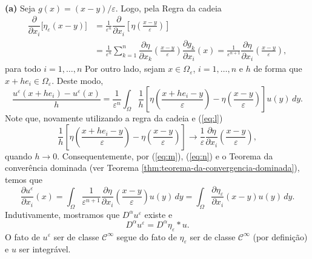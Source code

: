 \documentclass[a4paper, 11pt]{book}
\theoremstyle{definition}
\newcommand{\cC}{\mathcal{C}}
\begin{document}
\begin{prf}
    ~

    \textbf{(a)} Seja $g(x) = (x-y)/\varepsilon $. Logo, pela Regra da cadeia
    \begin{equation} \label{eq:l}
        \begin{aligned}
            \dfrac{\partial}{\partial x_i} \big[\eta_\varepsilon(x-y)\big] &= \frac{1}{\varepsilon^n}\dfrac{\partial }{\partial x_i}\left[\eta\left( \frac{x - y}{\varepsilon} \right) \right]\\ &= \frac{1}{\varepsilon^n} \sum_{k =1}^n \dfrac{\partial \eta}{\partial x_k}\left( \frac{x - y}{\varepsilon} \right) \dfrac{\partial g_k}{\partial x_i}(x) = \frac{1}{\varepsilon^{n+1}} \dfrac{\partial \eta}{\partial x_i}\left( \frac{x - y}{\varepsilon} \right),
        \end{aligned}
    \end{equation}
    para todo $i = 1,\dots,n$ Por outro lado, sejam $x \in \Omega_\varepsilon$, $i = 1,\dots,n$ e $h$ de forma que $x + he_i \in \Omega_\varepsilon$. Deste modo,
    \begin{equation} \label{eq:m}
        \frac{u^\varepsilon(x + he_i) - u^\varepsilon(x)}{h} 
            = \frac{1}{\varepsilon^n} \int_\Omega \frac{1}{h}\left[  \eta\left( \frac{x + he_i - y}{\varepsilon} \right) - \eta\left( \frac{x -y}{\varepsilon} \right) \right] u(y) \,dy.
    \end{equation} 
    Note que, novamente utilizando a regra da cadeia e (\ref{eq:l})
    \begin{equation} \label{eq:n}
        \frac{1}{h}\left[  \eta\left( \frac{x + he_i - y}{\varepsilon} \right) - \eta\left( \frac{x -y}{\varepsilon} \right) \right] \to \frac{1}{\varepsilon}\dfrac{\partial \eta}{\partial x_i}\left( \frac{x - y}{\varepsilon} \right),
    \end{equation}
    quando $h \to 0$. Consequentemente, por (\ref{eq:m}), (\ref{eq:n}) e o Teorema da converência dominada (ver Teorema \ref{thm:teorema-da-convergencia-dominada}), temos que
    \[
        \dfrac{\partial u^\varepsilon}{\partial x_i}(x) = \int_\Omega \frac{1}{\varepsilon^{n+1}} \dfrac{\partial \eta}{\partial x_i}\left( \frac{x - y}{\varepsilon} \right) u(y) \,dy = \int_\Omega \dfrac{\partial \eta_\varepsilon}{\partial x_i} (x-y) u(y) \,dy.
    \]
    Indutivamente, mostramos que $D^\alpha u^\varepsilon$ existe e
    \[
        D^\alpha u^\varepsilon = D^\alpha\eta_\varepsilon * u.
    \]
    O fato de $u^\varepsilon$ ser de classe $\cC^\infty$ segue do fato de $\eta_\varepsilon$ ser de classe $\cC^\infty$ (por definição) e $u$ ser integrável.


\end{prf}
\end{document}
